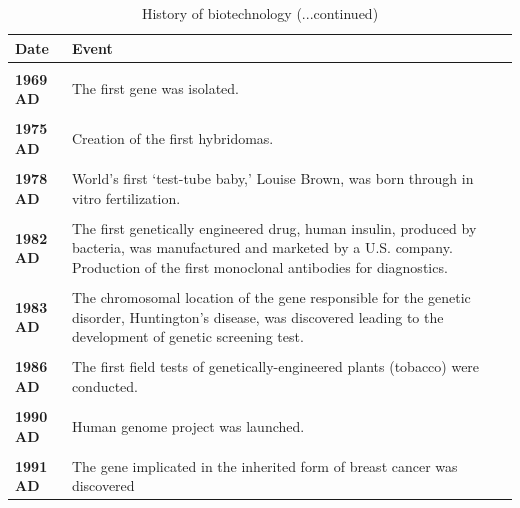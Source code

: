 \documentclass[
  ignorenonframetext,
  aspectratio=169]{beamer}
\begin{document}
\begin{frame}{}
\protect\hypertarget{section-2}{}
\begin{table}

\caption{\label{tab:biotechnology-history2}History of biotechnology (...continued)}
\centering
\fontsize{5}{7}\selectfont
\begin{tabular}[t]{>{}l>{\raggedright\arraybackslash}p{40em}}
\toprule
Date & Event\\
\midrule
\textbf{\cellcolor{gray!6}{1961 AD}} & \cellcolor{gray!6}{Deciphering of genetic code by M.Nirenberg and H.G. Khorana.}\\
\textbf{1969 AD} & The first gene was isolated.\\
\textbf{\cellcolor{gray!6}{1973 AD}} & \cellcolor{gray!6}{The first genetic engineering experiment was carried out by Walter Gilbert.}\\
\textbf{1975 AD} & Creation of the first hybridomas.\\
\textbf{\cellcolor{gray!6}{1976 AD}} & \cellcolor{gray!6}{The first biotech company.}\\
\addlinespace
\textbf{1978 AD} & World’s first ‘test-tube baby,’ Louise Brown, was born through in vitro fertilization.\\
\textbf{\cellcolor{gray!6}{1981 AD}} & \cellcolor{gray!6}{The first gene was synthesized. The first DNA synthesizer was developed.}\\
\textbf{1982 AD} & The first genetically engineered drug, human insulin, produced by bacteria, was manufactured and marketed by a U.S. company. Production of the first monoclonal antibodies for diagnostics.\\
\textbf{\cellcolor{gray!6}{1983 AD}} & \cellcolor{gray!6}{The first transgenic plant was created—a petunia plant was genetically engineered to be resistant to kanamycin, an antibiotic.}\\
\textbf{1983 AD} & The chromosomal location of the gene responsible for the genetic disorder, Huntington’s disease, was discovered leading to the development of genetic screening test.\\
\addlinespace
\textbf{\cellcolor{gray!6}{1985 AD}} & \cellcolor{gray!6}{DNA fingerprinting was first used in a criminal investigation.}\\
\textbf{1986 AD} & The first field tests of genetically-engineered plants (tobacco) were conducted.\\
\textbf{\cellcolor{gray!6}{1990 AD}} & \cellcolor{gray!6}{Chymosin, an enzyme used in cheese making, became the first product of genetic engineering to be introduced into the food supply}\\
\textbf{1990 AD} & Human genome project was launched.\\
\textbf{\cellcolor{gray!6}{1990 AD}} & \cellcolor{gray!6}{The first human gene therapy trial was performed on a four-year-old girl with an immune disorder.}\\
\addlinespace
\textbf{1991 AD} & The gene implicated in the inherited form of breast cancer was discovered\\
\bottomrule
\end{tabular}
\end{table}
\end{frame}
\end{document}

